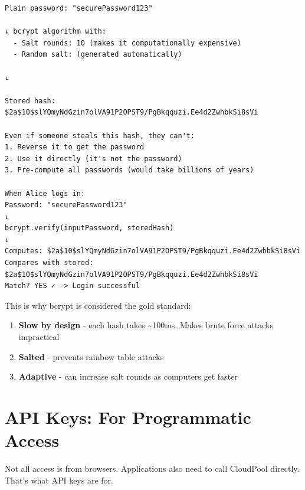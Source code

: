 \documentclass[11pt,a4paper]{report}
\begin{document}
\begin{lstlisting}[language=text]
Plain password: "securePassword123"

↓ bcrypt algorithm with:
  - Salt rounds: 10 (makes it computationally expensive)
  - Random salt: (generated automatically)

↓

Stored hash: $2a$10$slYQmyNdGzin7olVA91P2OPST9/PgBkqquzi.Ee4d2ZwhbkSi8sVi

Even if someone steals this hash, they can't:
1. Reverse it to get the password
2. Use it directly (it's not the password)
3. Pre-compute all passwords (would take billions of years)

When Alice logs in:
Password: "securePassword123"
↓
bcrypt.verify(inputPassword, storedHash)
↓
Computes: $2a$10$slYQmyNdGzin7olVA91P2OPST9/PgBkqquzi.Ee4d2ZwhbkSi8sVi
Compares with stored: $2a$10$slYQmyNdGzin7olVA91P2OPST9/PgBkqquzi.Ee4d2ZwhbkSi8sVi
Match? YES ✓ -> Login successful
\end{lstlisting}

This is why bcrypt is considered the gold standard:
\begin{enumerate}
\item \textbf{Slow by design} - each hash takes {\textasciitilde}100ms. Makes brute force attacks impractical
\item \textbf{Salted} - prevents rainbow table attacks
\item \textbf{Adaptive} - can increase salt rounds as computers get faster

\end{enumerate}

\chapter{API Keys: For Programmatic Access}


Not all access is from browsers. Applications also need to call CloudPool directly. That's what API keys are for.
\end{document}
